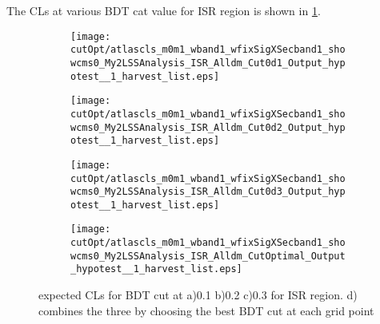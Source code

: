 The CLs at various BDT cat value for ISR region is shown in \ref{fig:ISR_BDTCut_CLs}.

\begin{figure}
	\centering
    \begin{subfigure}[b]{0.4\textwidth}
        \texttt{[image: cutOpt/atlascls\_m0m1\_wband1\_wfixSigXSecband1\_showcms0\_My2LSSAnalysis\_ISR\_Alldm\_Cut0d1\_Output\_hypotest\_\_1\_harvest\_list.eps]}
        \caption{}
    \end{subfigure}
    \begin{subfigure}[b]{0.4\textwidth}
        \texttt{[image: cutOpt/atlascls\_m0m1\_wband1\_wfixSigXSecband1\_showcms0\_My2LSSAnalysis\_ISR\_Alldm\_Cut0d2\_Output\_hypotest\_\_1\_harvest\_list.eps]}
        \caption{}
    \end{subfigure}

    \begin{subfigure}[b]{0.4\textwidth}
        \texttt{[image: cutOpt/atlascls\_m0m1\_wband1\_wfixSigXSecband1\_showcms0\_My2LSSAnalysis\_ISR\_Alldm\_Cut0d3\_Output\_hypotest\_\_1\_harvest\_list.eps]}
        \caption{}
    \end{subfigure}
    \begin{subfigure}[b]{0.4\textwidth}
        \texttt{[image: cutOpt/atlascls\_m0m1\_wband1\_wfixSigXSecband1\_showcms0\_My2LSSAnalysis\_ISR\_Alldm\_CutOptimal\_Output\_hypotest\_\_1\_harvest\_list.eps]}
        \caption{}
    \end{subfigure}

\caption{expected CLs for BDT cut at a)0.1 b)0.2 c)0.3 for ISR region. d) combines the three by choosing the best BDT cut at each grid point }
\label{fig:ISR_BDTCut_CLs}
\end{figure}

